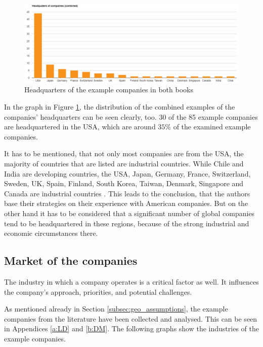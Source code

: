 \documentclass[a4]{scrartcl}
\begin{document}
\begin{figure}[H]
	\centering
	\includegraphics[width=1\textwidth]{images/combi_graph.png}
	\caption{Headquarters of the example companies in both books \cite{digitalmatrix, leadingdigital}}
	\label{fig:C_graph}
\end{figure}

In the graph in Figure \ref{fig:C_graph}, the distribution of the combined examples of the companies' headquarters can be seen clearly, too. 30 of the 85 example companies are headquartered in the USA, which are around $35\%$ of the examined example companies.

It has to be mentioned, that not only most companies are from the USA, the majority of countries that are listed are industrial countries. 
While Chile and India are developing countries, the USA, Japan, Germany, France, Switzerland, Sweden, UK, Spain, Finland, South Korea, Taiwan, Denmark, Singapore and Canada are industrial countries \cite{UN}.
This leads to the conclusion, that the authors base their strategies on their experience with American companies. But on the other hand it has to be considered that a significant number of global companies tend to be headquartered in these regions, because of the strong industrial and economic circumstances there. \cite{basis1, basis2}










\subsection{Market of the companies} \label{subsec:market_assumptions}

The industry in which a company operates  is a critical factor as well. It influences the company's approach, priorities, and potential challenges.

As mentioned already in Section \ref{subsec:geo_assumptions}, the example companies from the literature have been collected and analysed. This can be seen in Appendices \ref{a:LD} and \ref{b:DM}. The following graphs show the industries of the example companies.
\end{document}
